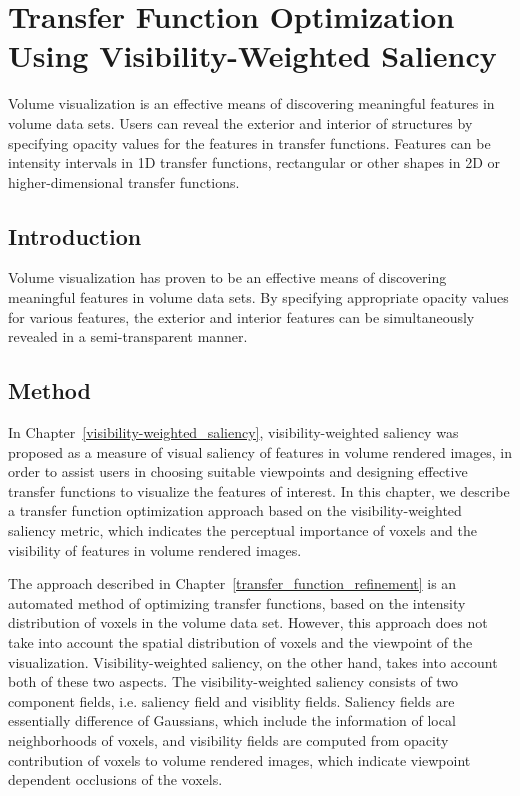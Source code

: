 \chapter{Transfer Function Optimization Using Visibility-Weighted Saliency}
Volume visualization is an effective means of discovering meaningful features in volume data sets. Users can reveal the exterior and interior of structures by specifying opacity values for the features in transfer functions. Features can be intensity intervals in 1D transfer functions, rectangular or other shapes in 2D or higher-dimensional transfer functions.

\section{Introduction}
Volume visualization has proven to be an effective means of discovering meaningful features in volume data sets. By specifying appropriate opacity values for various features, the exterior and interior features can be simultaneously revealed in a semi-transparent manner.

\section{Method}
In Chapter~\ref{visibility-weighted_saliency}, visibility-weighted saliency was proposed as a measure of visual saliency of features in volume rendered images, in order to assist users in choosing suitable viewpoints and designing effective transfer functions to visualize the features of interest. In this chapter, we describe a transfer function optimization approach based on the visibility-weighted saliency metric, which indicates the perceptual importance of voxels and the visibility of features in volume rendered images.

The approach described in Chapter~\ref{transfer_function_refinement} is an automated method of optimizing transfer functions, based on the intensity distribution of voxels in the volume data set. However, this approach does not take into account the spatial distribution of voxels and the viewpoint of the visualization. Visibility-weighted saliency, on the other hand, takes into account both of these two aspects. The visibility-weighted saliency consists of two component fields, i.e. saliency field and visiblity fields. Saliency fields are essentially difference of Gaussians, which include the information of local neighborhoods of voxels, and visibility fields are computed from opacity contribution of voxels to volume rendered images, which indicate viewpoint dependent occlusions of the voxels.


